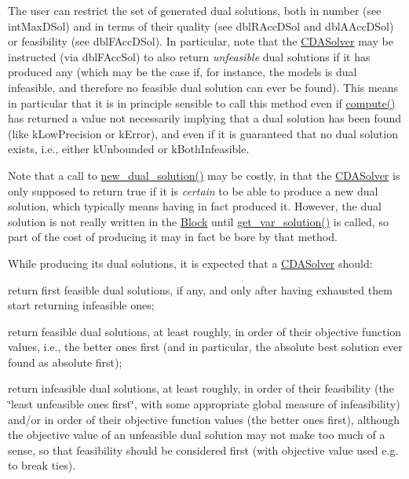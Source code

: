 The user can restrict the set of generated dual solutions, both in number (see int\+Max\+D\+Sol) and in terms of their quality (see dbl\+R\+Acc\+D\+Sol and dbl\+A\+Acc\+D\+Sol) or feasibility (see dbl\+F\+Acc\+D\+Sol). In particular, note that the \mbox{\hyperlink{class_s_m_spp__di__unipi__it_1_1_c_d_a_solver}{C\+D\+A\+Solver}} may be instructed (via dbl\+F\+Acc\+Sol) to also return {\itshape unfeasible} dual solutions if it has produced any (which may be the case if, for instance, the models is dual infeasible, and therefore no feasible dual solution can ever be found). This means in particular that it is in principle sensible to call this method even if \mbox{\hyperlink{class_s_m_spp__di__unipi__it_1_1_solver_a504d4e3e174c7a518cc66156a8a45ce5}{compute()}} has returned a value not necessarily implying that a dual solution has been found (like k\+Low\+Precision or k\+Error), and even if it is guaranteed that no dual solution exists, i.\+e., either k\+Unbounded or k\+Both\+Infeasible.

Note that a call to \mbox{\hyperlink{class_s_m_spp__di__unipi__it_1_1_c_d_a_solver_a8c650415b6673c33692c363abdfdef00}{new\+\_\+dual\+\_\+solution()}} may be costly, in that the \mbox{\hyperlink{class_s_m_spp__di__unipi__it_1_1_c_d_a_solver}{C\+D\+A\+Solver}} is only supposed to return true if it is {\itshape certain} to be able to produce a new dual solution, which typically means having in fact produced it. However, the dual solution is not really written in the \mbox{\hyperlink{class_s_m_spp__di__unipi__it_1_1_block}{Block}} until \mbox{\hyperlink{class_s_m_spp__di__unipi__it_1_1_solver_a91d7cd0dc4fa453406ef30db2bfa37a5}{get\+\_\+var\+\_\+solution()}} is called, so part of the cost of producing it may in fact be bore by that method.

While producing its dual solutions, it is expected that a \mbox{\hyperlink{class_s_m_spp__di__unipi__it_1_1_c_d_a_solver}{C\+D\+A\+Solver}} should\+:


\begin{DoxyItemize}
\item return first feasible dual solutions, if any, and only after having exhausted them start returning infeasible ones;
\item return feasible dual solutions, at least roughly, in order of their objective function values, i.\+e., the better ones first (and in particular, the absolute best solution ever found as absolute first);
\item return infeasible dual solutions, at least roughly, in order of their feasibility (the \char`\"{}least unfeasible ones first\char`\"{}, with some appropriate global measure of infeasibility) and/or in order of their objective function values (the better ones first), although the objective value of an unfeasible dual solution may not make too much of a sense, so that feasibility should be considered first (with objective value used e.\+g. to break ties).
\end{DoxyItemize}

